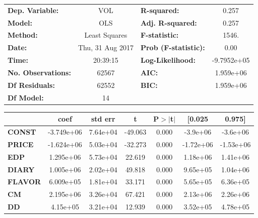 \begin{center}
\begin{tabular}{lclc}
\toprule
\textbf{Dep. Variable:}    &        VOL         & \textbf{  R-squared:         } &      0.257   \\
\textbf{Model:}            &       OLS        & \textbf{  Adj. R-squared:    } &      0.257   \\
\textbf{Method:}           &  Least Squares   & \textbf{  F-statistic:       } &      1546.   \\
\textbf{Date:}             & Thu, 31 Aug 2017 & \textbf{  Prob (F-statistic):} &      0.00    \\
\textbf{Time:}             &     20:39:15     & \textbf{  Log-Likelihood:    } & -9.7952e+05  \\
\textbf{No. Observations:} &       62567      & \textbf{  AIC:               } &  1.959e+06   \\
\textbf{Df Residuals:}     &       62552      & \textbf{  BIC:               } &  1.959e+06   \\
\textbf{Df Model:}         &          14      & \textbf{                     } &              \\
\bottomrule
\end{tabular}
\begin{tabular}{lcccccc}
               & \textbf{coef} & \textbf{std err} & \textbf{t} & \textbf{P$>$$|$t$|$} & \textbf{[0.025} & \textbf{0.975]}  \\
\midrule
\textbf{CONST} &   -3.749e+06  &     7.64e+04     &   -49.063  &         0.000        &     -3.9e+06    &     -3.6e+06     \\
\textbf{PRICE}    &   -1.624e+06  &     5.03e+04     &   -32.273  &         0.000        &    -1.72e+06    &    -1.53e+06     \\
\textbf{EDP}    &    1.295e+06  &     5.73e+04     &    22.619  &         0.000        &     1.18e+06    &     1.41e+06     \\
\textbf{DIARY}    &    1.005e+06  &     2.02e+04     &    49.818  &         0.000        &     9.65e+05    &     1.04e+06     \\
\textbf{FLAVOR}    &    6.009e+05  &     1.81e+04     &    33.171  &         0.000        &     5.65e+05    &     6.36e+05     \\
\textbf{CM}    &    2.195e+06  &     3.26e+04     &    67.421  &         0.000        &     2.13e+06    &     2.26e+06     \\
\textbf{DD}    &     4.15e+05  &     3.21e+04     &    12.939  &         0.000        &     3.52e+05    &     4.78e+05     \\

\end{tabular}
\end{center}
